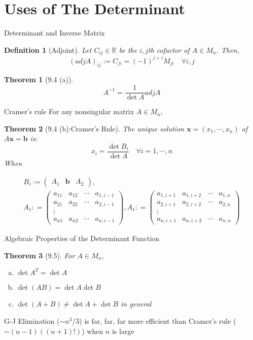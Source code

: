 \documentclass[final]{beamer}
\newtheorem{defn}{Definition}
\newtheorem{thm}{Theorem}
\begin{document}
\section{Uses of The Determinant} %
\label{sec:uses_of_the_determinant}
\begin{frame}[t]{Determinant and Inverse Matrix}
	\begin{defn}
		[Adjoint] Let $C_{ij}\in\mathbb{R}$ be the $i,j$th cofactor of $A\in M_n$. Then, \[
			(adj A)_{ij}:=C_{ji} = (-1)^{j+i}M_{ji} \quad\forall i,j
		\]
	\end{defn}
	\begin{thm}
		[9.4 (a)]\[
			A^{-1} = \frac{1}{\det A}adj A
		\]
	\end{thm}
\end{frame}
\begin{frame}[t]{Cramer's rule}
	For any nonsingular matrix $A\in M_n$,
	\begin{thm}
		[9.4 (b):Cramer's Rule]
			The unique solution $\mathbf{x}=(x_1,\cdots,x_n)$ of $A\mathbf{x}=\mathbf{b}$ is:
			\[
				x_i = \frac{\det B_i}{\det A} \quad\forall i=1,\cdots,n
			\] When 
			\begin{tiny}
				\begin{multline*}
					B_i := \begin{pmatrix}
						A_1 & \mathbf{b} & A_2
					\end{pmatrix},\\ A_1 : = \begin{pmatrix}
						a_{11}&a_{12}&\cdots&a_{1,i-1}\\
						a_{21}&a_{22}&\cdots&a_{2,i-1}\\
						\vdots\\
						a_{n1}&a_{n2}&\cdots&a_{n,i-1}
					\end{pmatrix}, A_1 : = \begin{pmatrix}
						a_{1,i+1}&a_{1,i+2}&\cdots&a_{1,n}\\
						a_{2,i+1}&a_{2,i+2}&\cdots&a_{2,n}\\
						\vdots\\
						a_{n,i+1}&a_{n,i+2}&\cdots&a_{n,n}
					\end{pmatrix}
				\end{multline*}
			\end{tiny}
	\end{thm}
\end{frame}
\begin{frame}[t]{Algebraic Properties of the Determinant Function}
	\begin{thm}
		[9.5] For $A\in M_n$, 
		\begin{enumerate}[(a)]
			\item $\det A^T = \det A$
			\item $\det(AB)=\det A \det B$
			\item $\det(A+B)\neq \det A + \det B$ in general
		\end{enumerate}
	\end{thm}
	G-J Elimination ($\sim n^3/3$) is far, far, far more efficient than Cramer's rule ($\sim (n-1)((n+1)!)$) when $n$ is large
\end{frame}
\end{document}
